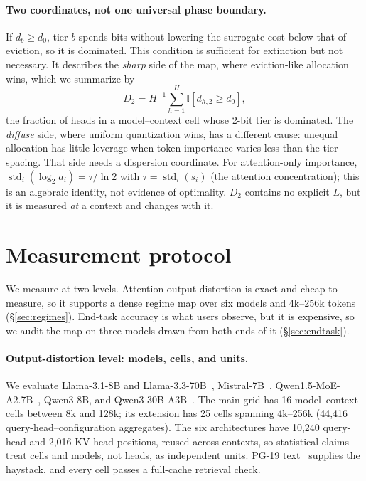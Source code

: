 \documentclass{article}
\theoremstyle{definition}
\begin{document}
\paragraph{Two coordinates, not one universal phase boundary.}
If $d_b\ge d_0$, tier $b$ spends bits without lowering the surrogate cost below that of eviction, so it is dominated.  This condition is sufficient for extinction but not necessary.  It describes the \emph{sharp} side of the map, where eviction-like allocation wins, which we summarize by
\begin{equation}
 D_2=H^{-1}\textstyle\sum_{h=1}^{H}\mathbb I[d_{h,2}\ge d_0],
 \label{eq:d2}
\end{equation}
the fraction of heads in a model--context cell whose 2-bit tier is dominated.  The \emph{diffuse} side, where uniform quantization wins, has a different cause: unequal allocation has little leverage when token importance varies less than the tier spacing.  That side needs a dispersion coordinate.  For attention-only importance, $\operatorname{std}_i(\log_2a_i)=\tau/\ln2$ with $\tau=\operatorname{std}_i(s_i)$ (the attention concentration); this is an algebraic identity, not evidence of optimality.  $D_2$ contains no explicit $L$, but it is measured \emph{at} a context and changes with it.

\section{Measurement protocol}
\label{sec:protocol}

We measure at two levels.  Attention-output distortion is exact and cheap to measure, so it supports a dense regime map over six models and 4k--256k tokens (\S\ref{sec:regimes}).  End-task accuracy is what users observe, but it is expensive, so we audit the map on three models drawn from both ends of it (\S\ref{sec:endtask}).

\paragraph{Output-distortion level: models, cells, and units.}
We evaluate Llama-3.1-8B and Llama-3.3-70B~\citep{grattafiori2024llama3}, Mistral-7B~\citep{jiang2023mistral}, Qwen1.5-MoE-A2.7B~\citep{qwen2024moe}, Qwen3-8B, and Qwen3-30B-A3B~\citep{yang2025qwen3}.  The main grid has 16 model--context cells between 8k and 128k; its extension has 25 cells spanning 4k--256k (44,416 query-head--configuration aggregates).  The six architectures have 10,240 query-head and 2,016 KV-head positions, reused across contexts, so statistical claims treat cells and models, not heads, as independent units.  PG-19 text~\citep{rae2020pg19} supplies the haystack, and every cell passes a full-cache retrieval check.
\end{document}
